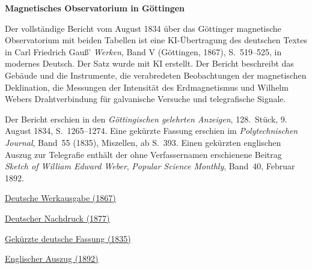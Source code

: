 \clearpage
\thispagestyle{empty}
\begin{center}\Large\textbf{Magnetisches Observatorium in Göttingen}\end{center}

Der vollständige Bericht vom August 1834 über das Göttinger magnetische Observatorium mit beiden Tabellen ist eine KI-Übertragung des deutschen Textes in Carl Friedrich Gauß’ \textit{Werken}, Band V (Göttingen, 1867), S.~519--525, in modernes Deutsch. Der Satz wurde mit KI erstellt. Der Bericht beschreibt das Gebäude und die Instrumente, die verabredeten Beobachtungen der magnetischen Deklination, die Messungen der Intensität des Erdmagnetismus und Wilhelm Webers Drahtverbindung für galvanische Versuche und telegrafische Signale.

Der Bericht erschien in den \textit{Göttingischen gelehrten Anzeigen}, 128.~Stück, 9. August 1834, S.~1265--1274. Eine gekürzte Fassung erschien im \textit{Polytechnischen Journal}, Band~55 (1835), Miszellen, ab S.~393. Einen gekürzten englischen Auszug zur Telegrafie enthält der ohne Verfassernamen erschienene Beitrag \textit{Sketch of William Edward Weber}, \textit{Popular Science Monthly}, Band~40, Februar 1892.

\medskip\noindent
\href{https://gdz.sub.uni-goettingen.de/id/PPN236006339}{Deutsche Werkausgabe (1867)}\par
\noindent\href{https://doi.org/10.1007/978-3-642-49319-5_28}{Deutscher Nachdruck (1877)}\par
\noindent\href{https://dingler.bbaw.de/articles/mi055069_1.html}{Gekürzte deutsche Fassung (1835)}\par
\noindent\href{https://en.wikisource.org/w/index.php?title=Popular_Science_Monthly/Volume_40/February_1892/Sketch_of_William_Edward_Weber\&oldid=8847389}{Englischer Auszug (1892)}
\clearpage
